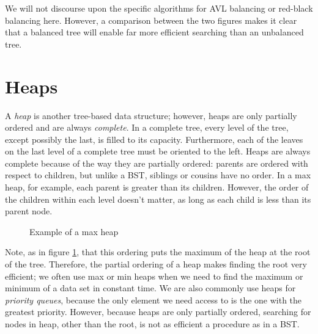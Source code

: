 We will not discourse upon the specific algorithms for AVL balancing or red-black balancing here.
However, a comparison between the two figures makes it clear that a balanced tree will enable far more efficient searching than an unbalanced tree.

\section*{Heaps}
A \emph{heap} is another tree-based data structure; however, heaps are only partially ordered and are always \emph{complete}.
In a complete tree, every level of the tree, except possibly the last, is filled to its capacity.
Furthermore, each of the leaves on the last level of a complete tree must be oriented to the left.
Heaps are always complete because of the way they are partially ordered: parents are ordered with respect to children, but unlike a BST, siblings or cousins have no order.
In a max heap, for example, each parent is greater than its children.
However, the order of the children within each level doesn't matter, as long as each child is less than its parent node.
\begin{figure}[h]
\begin{centering}
\end{centering}
\caption{Example of a max heap}
\label{fig:Max Heap}
\end{figure}
Note, as in figure \ref{fig:Max Heap}, that this ordering puts the maximum of the heap at the root of the tree.
Therefore, the partial ordering of a heap makes finding the root very efficient; we often use max or min heaps when we need to find the maximum or minimum of a data set in constant time.
We are also commonly use heaps for \emph{priority queues}, because the only element we need access to is the one with the greatest priority.
However, because heaps are only partially ordered, searching for nodes in heap, other than the root, is not as efficient a procedure as in a BST.

